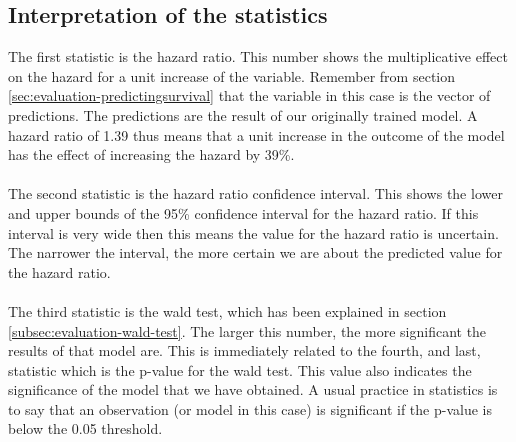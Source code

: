 \subsection{Interpretation of the statistics}
The first statistic is the hazard ratio. This number shows the multiplicative effect on the hazard for a unit increase of the variable. Remember from section \ref{sec:evaluation-predictingsurvival} that the variable in this case is the vector of predictions. The predictions are the result of our originally trained model. A hazard ratio of 1.39 thus means that a unit increase in the outcome of the model has the effect of increasing the hazard by 39\%. \\ \\
The second statistic is the hazard ratio confidence interval. This shows the lower and upper bounds of the 95\% confidence interval for the hazard ratio. If this interval is very wide then this means the value for the hazard ratio is uncertain. The narrower the interval, the more certain we are about the predicted value for the hazard ratio. \\ \\
The third statistic is the wald test, which has been explained in section \ref{subsec:evaluation-wald-test}. The larger this number, the more significant the results of that model are. This is immediately related to the fourth, and last, statistic which is the p-value for the wald test. This value also indicates the significance of the model that we have obtained. A usual practice in statistics is to say that an observation (or model in this case) is significant if the p-value is below the 0.05 threshold.
